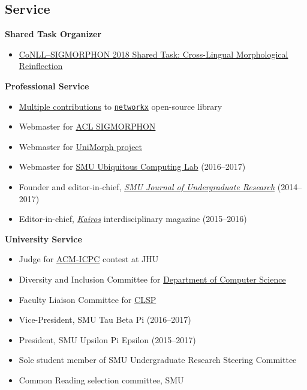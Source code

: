 \documentclass[margin, 10pt]{res} %
\newcommand{\clsp}{\href{https://www.clsp.jhu.edu}{CLSP}}
\begin{document}
\begin{resume}
\section{Service}

\textbf{Shared Task Organizer}
\begin{itemize}
\item \href{https://sigmorphon.github.io/sharedtasks/2018/}{CoNLL--SIGMORPHON 2018 Shared Task: Cross-Lingual Morphological Reinflection}

\end{itemize}

\textbf{Professional Service}

\begin{itemize}[noitemsep]
\item \href{https://github.com/networkx/networkx/pulls?utf8=?&q=is\%3Apr+author\%3Aaryamccarthy+}{Multiple contributions} to \href{http://networkx.github.io}{\texttt{networkx}} open-source library
\item Webmaster for \href{https://sigmorphon.github.io}{ACL SIGMORPHON}
\item Webmaster for \href{https://unimorph.github.io}{UniMorph project}
\item Webmaster for \href{http://ubicomp.lyle.smu.edu}{SMU Ubiquitous Computing Lab} (2016--2017)
\item Founder and editor-in-chief, \href{https://smuresearch.wordpress.com/journal/}{\emph{SMU Journal of Undergraduate Research}} (2014--2017)
\item Editor-in-chief, \href{https://smuresearch.wordpress.com/kairos/}{\emph{Kairos}} interdisciplinary magazine (2015--2016)
\end{itemize}


\textbf{University Service}

\begin{itemize}[noitemsep]
\item Judge for \href{https://en.wikipedia.org/wiki/ACM_International_Collegiate_Programming_Contest}{ACM-ICPC} contest at JHU
\item Diversity and Inclusion Committee for \href{https://www.cs.jhu.edu}{Department of Computer Science}
\item Faculty Liaison Committee for \clsp
\item Vice-President, SMU Tau Beta Pi (2016--2017)
\item President, SMU Upsilon Pi Epsilon (2015--2017)
\item Sole student member of SMU Undergraduate Research Steering Committee
\item Common Reading selection committee, SMU
\end{itemize}


\end{resume}
\end{document}
